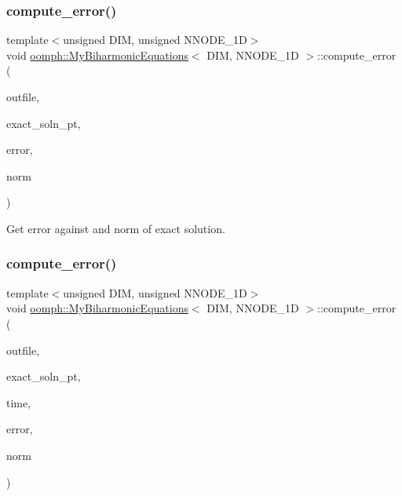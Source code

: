 \subsubsection{\texorpdfstring{compute\+\_\+error()}{compute\_error()}\hspace{0.1cm}{\footnotesize\ttfamily [2/4]}}
{\footnotesize\ttfamily template$<$unsigned D\+IM, unsigned N\+N\+O\+D\+E\+\_\+1D$>$ \\
void \hyperlink{classoomph_1_1MyBiharmonicEquations}{oomph\+::\+My\+Biharmonic\+Equations}$<$ D\+IM, N\+N\+O\+D\+E\+\_\+1D $>$\+::compute\+\_\+error (\begin{DoxyParamCaption}\item[{std\+::ostream \&}]{outfile,  }\item[{Finite\+Element\+::\+Steady\+Exact\+Solution\+Fct\+Pt}]{exact\+\_\+soln\+\_\+pt,  }\item[{double \&}]{error,  }\item[{double \&}]{norm }\end{DoxyParamCaption})}



Get error against and norm of exact solution. 

\mbox{\label{classoomph_1_1MyBiharmonicEquations_a617b8c8dc3dbac7aeb9d466f6da4edb9}} 
\subsubsection{\texorpdfstring{compute\+\_\+error()}{compute\_error()}\hspace{0.1cm}{\footnotesize\ttfamily [3/4]}}
{\footnotesize\ttfamily template$<$unsigned D\+IM, unsigned N\+N\+O\+D\+E\+\_\+1D$>$ \\
void \hyperlink{classoomph_1_1MyBiharmonicEquations}{oomph\+::\+My\+Biharmonic\+Equations}$<$ D\+IM, N\+N\+O\+D\+E\+\_\+1D $>$\+::compute\+\_\+error (\begin{DoxyParamCaption}\item[{std\+::ostream \&}]{outfile,  }\item[{Finite\+Element\+::\+Unsteady\+Exact\+Solution\+Fct\+Pt}]{exact\+\_\+soln\+\_\+pt,  }\item[{const double \&}]{time,  }\item[{double \&}]{error,  }\item[{double \&}]{norm }\end{DoxyParamCaption})\hspace{0.3cm}{\ttfamily [inline]}}



